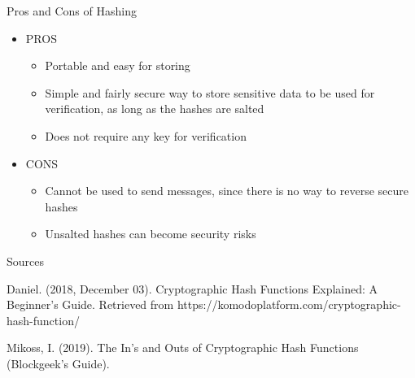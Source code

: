\documentclass{article}
\begin{document}
{Pros and Cons of Hashing}
	\begin{itemize}
		\item PROS
		\begin{itemize}
			\item Portable and easy for storing
			\item Simple and fairly secure way to store sensitive data to be used for verification, as long as the hashes are salted
			\item Does not require any key for verification 
		\end{itemize}
		\item CONS
		\begin{itemize}
			\item Cannot be used to send messages, since there is no way to reverse secure hashes
			\item Unsalted hashes can become security risks   \newline
		\end{itemize}
		
	\end{itemize}

{Sources}
\begin{thebibliography}{}
	Daniel. (2018, December 03). Cryptographic Hash Functions Explained: A Beginner's Guide. Retrieved from {https://komodoplatform.com/cryptographic-hash-function/}
	
	
	
	
	Mikoss, I. (2019). The In's and Outs of Cryptographic Hash Functions (Blockgeek's Guide).
\end{thebibliography}
\end{document}
